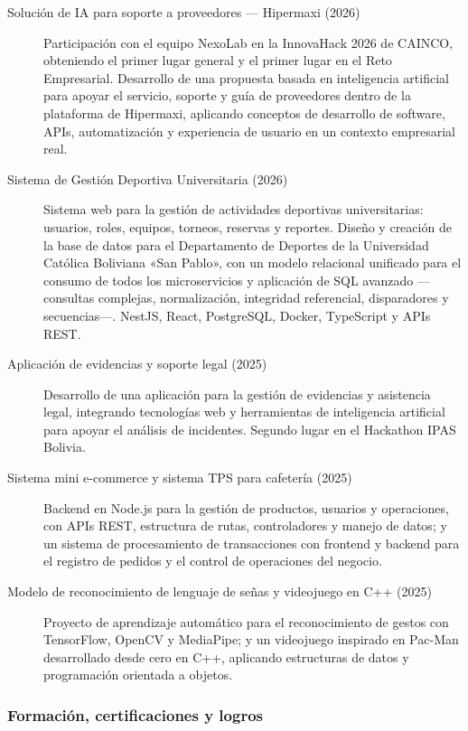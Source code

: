 \begin{description}
  \item[Solución de IA para soporte a proveedores — Hipermaxi (2026)]
  Participación con el equipo NexoLab en la InnovaHack 2026 de CAINCO, obteniendo
  el primer lugar general y el primer lugar en el Reto Empresarial. Desarrollo de
  una propuesta basada en inteligencia artificial para apoyar el servicio,
  soporte y guía de proveedores dentro de la plataforma de Hipermaxi, aplicando
  conceptos de desarrollo de software, APIs, automatización y experiencia de
  usuario en un contexto empresarial real.

  \item[Sistema de Gestión Deportiva Universitaria (2026)]
  Sistema web para la gestión de actividades deportivas universitarias: usuarios,
  roles, equipos, torneos, reservas y reportes. Diseño y creación de la base de
  datos para el Departamento de Deportes de la Universidad Católica Boliviana
  «San Pablo», con un modelo relacional unificado para el consumo de todos los
  microservicios y aplicación de SQL avanzado —consultas complejas,
  normalización, integridad referencial, disparadores y secuencias—. NestJS,
  React, PostgreSQL, Docker, TypeScript y APIs REST.

  \item[Aplicación de evidencias y soporte legal (2025)]
  Desarrollo de una aplicación para la gestión de evidencias y asistencia legal,
  integrando tecnologías web y herramientas de inteligencia artificial para
  apoyar el análisis de incidentes. Segundo lugar en el Hackathon IPAS Bolivia.

  \item[Sistema mini e-commerce y sistema TPS para cafetería (2025)]
  Backend en Node.js para la gestión de productos, usuarios y operaciones, con
  APIs REST, estructura de rutas, controladores y manejo de datos; y un sistema
  de procesamiento de transacciones con frontend y backend para el registro de
  pedidos y el control de operaciones del negocio.

  \item[Modelo de reconocimiento de lenguaje de señas y videojuego en C++ (2025)]
  Proyecto de aprendizaje automático para el reconocimiento de gestos con
  TensorFlow, OpenCV y MediaPipe; y un videojuego inspirado en Pac-Man
  desarrollado desde cero en C++, aplicando estructuras de datos y programación
  orientada a objetos.
\end{description}

\subsubsection{Formación, certificaciones y logros}

